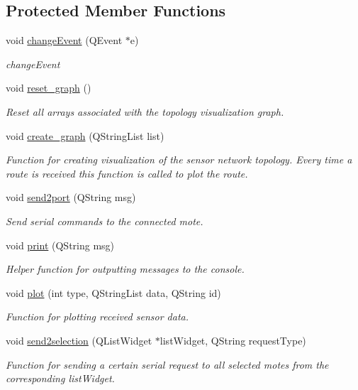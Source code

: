 \subsection*{Protected Member Functions}
\begin{DoxyCompactItemize}
\item 
void \hyperlink{classMainWindow_af4ca5d0d3d18ddcb7d54b6596bbf4797}{change\+Event} (Q\+Event $\ast$e)
\begin{DoxyCompactList}\small\item\em change\+Event \end{DoxyCompactList}\item 
\mbox{\label{classMainWindow_a3148593d5ab6ac6007967a4c43e28c16}} 
void \hyperlink{classMainWindow_a3148593d5ab6ac6007967a4c43e28c16}{reset\+\_\+graph} ()
\begin{DoxyCompactList}\small\item\em Reset all arrays associated with the topology visualization graph. \end{DoxyCompactList}\item 
void \hyperlink{classMainWindow_aa74278d87740ad86c6db91f071f7fd19}{create\+\_\+graph} (Q\+String\+List list)
\begin{DoxyCompactList}\small\item\em Function for creating visualization of the sensor network topology. Every time a route is received this function is called to plot the route. \end{DoxyCompactList}\item 
void \hyperlink{classMainWindow_af2cff5831eb2f2d562a070183b0f24af}{send2port} (Q\+String msg)
\begin{DoxyCompactList}\small\item\em Send serial commands to the connected mote. \end{DoxyCompactList}\item 
void \hyperlink{classMainWindow_ad87cfafc21d51c74902c8eb99b7fd90f}{print} (Q\+String msg)
\begin{DoxyCompactList}\small\item\em Helper function for outputting messages to the console. \end{DoxyCompactList}\item 
void \hyperlink{classMainWindow_aef3981280b4d81ab4b880e435a992ebd}{plot} (int type, Q\+String\+List data, Q\+String id)
\begin{DoxyCompactList}\small\item\em Function for plotting received sensor data. \end{DoxyCompactList}\item 
void \hyperlink{classMainWindow_ab053f15eaeb520f97732c5745a11bc9e}{send2selection} (Q\+List\+Widget $\ast$list\+Widget, Q\+String request\+Type)
\begin{DoxyCompactList}\small\item\em Function for sending a certain serial request to all selected motes from the corresponding list\+Widget. \end{DoxyCompactList}\end{DoxyCompactItemize}
